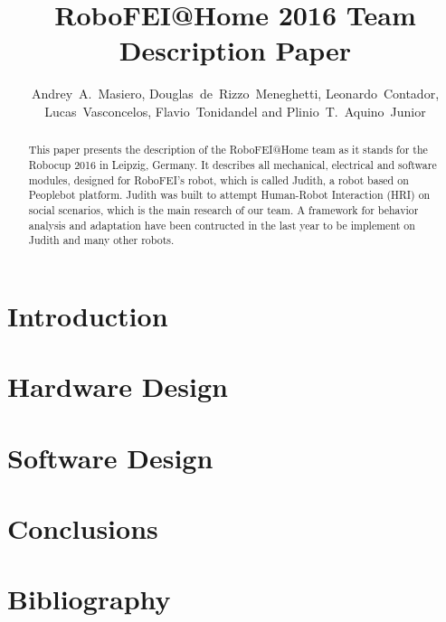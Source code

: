 \documentclass[runningheads,a4paper]{llncs}
\begin{document}
\title{RoboFEI@Home 2016 Team Description Paper}
\author{Andrey~A.~Masiero, Douglas~de~Rizzo~Meneghetti, Leonardo~Contador, Lucas~Vasconcelos, Flavio~Tonidandel and Plinio~T.~Aquino~Junior}

\maketitle



\begin{abstract}
This paper presents the description of the RoboFEI@Home team as it stands for the Robocup 2016 in Leipzig, Germany. It describes all mechanical, electrical and software modules, designed for RoboFEI's robot, which is called Judith, a robot based on Peoplebot platform. Judith was built to attempt Human-Robot Interaction (HRI) on social scenarios, which is the main research of our team. A framework for behavior analysis and adaptation have been contructed in the last year to be implement on Judith and many other robots.
\end{abstract}


\section{Introduction}


\section{Hardware Design}


\section{Software Design}
%

\section{Conclusions}
%

\section{Bibliography}
%
%
\end{document}
